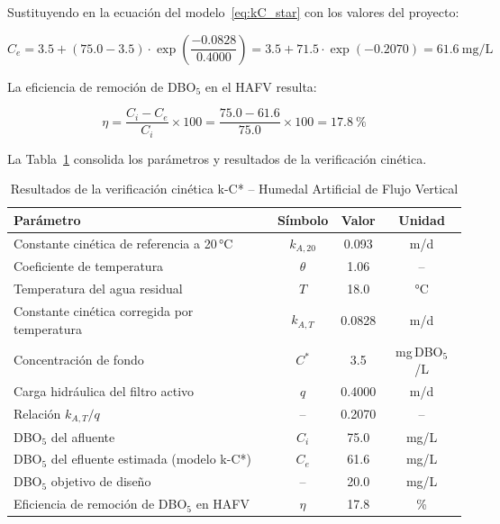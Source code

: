 \documentclass[12pt,a4paper]{article}
\begin{document}
Sustituyendo en la ecuación del modelo~\eqref{eq:kC_star} con los valores del proyecto:

\begin{equation}
C_e = 3.5 + (75.0 - 3.5) \cdot \exp\!\left(\frac{-0.0828}{0.4000}\right) = 3.5 + 71.5 \cdot \exp(-0.2070) = 61.6\ \text{mg/L}
\end{equation}

La eficiencia de remoción de DBO$_5$ en el HAFV resulta:

\begin{equation}
\eta = \frac{C_i - C_e}{C_i} \times 100 = \frac{75.0 - 61.6}{75.0} \times 100 = 17.8\ \%
\end{equation}

La Tabla~\ref{tab:verificacion_kC} consolida los parámetros y resultados de la verificación cinética.

\begin{table}[H]
\centering
\caption{Resultados de la verificación cinética k-C* -- Humedal Artificial de Flujo Vertical}
\label{tab:verificacion_kC}
\begin{tabular}{lccc}
\toprule
\textbf{Parámetro} & \textbf{Símbolo} & \textbf{Valor} & \textbf{Unidad} \\
\midrule
Constante cinética de referencia a 20\,°C & $k_{A,20}$ & 0.093 & m/d \\
Coeficiente de temperatura & $\theta$ & 1.06 & -- \\
Temperatura del agua residual & $T$ & 18.0 & °C \\
Constante cinética corregida por temperatura & $k_{A,T}$ & 0.0828 & m/d \\
Concentración de fondo & $C^*$ & 3.5 & mg\,DBO$_5$/L \\
Carga hidráulica del filtro activo & $q$ & 0.4000 & m/d \\
Relación $k_{A,T} / q$ & -- & 0.2070 & -- \\
DBO$_5$ del afluente & $C_i$ & 75.0 & mg/L \\
DBO$_5$ del efluente estimada (modelo k-C*) & $C_e$ & 61.6 & mg/L \\
DBO$_5$ objetivo de diseño & -- & 20.0 & mg/L \\
Eficiencia de remoción de DBO$_5$ en HAFV & $\eta$ & 17.8 & \% \\
\bottomrule
\end{tabular}
\end{table}
\end{document}
